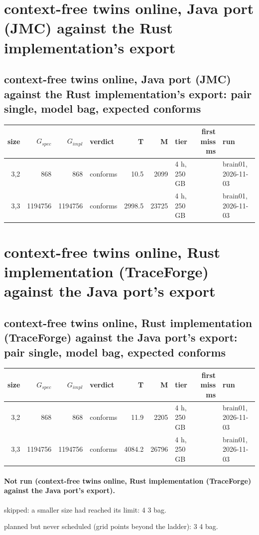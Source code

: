 \documentclass[10pt]{article}
\begin{document}
\section*{context-free twins online, Java port (JMC) against the Rust implementation's export}
\subsection*{context-free twins online, Java port (JMC) against the Rust implementation's export: pair \textsf{single}, model bag, expected conforms}
\begin{longtable}{@{}rrrlrrlrl@{}}
\toprule
size & $G_{\mathit{spec}}$ & $G_{\mathit{impl}}$ & verdict & T & M & tier & first miss ms & run \\
\midrule
\endhead
\color{blue} 3,2 & 868 & 868 & conforms & 10.5 & 2099 & 4 h, 250 GB &  & brain01, 2026-11-03 \\
\color{red} 3,3 & 1194756 & 1194756 & conforms & 2998.5 & 23725 & 4 h, 250 GB &  & brain01, 2026-11-03 \\
\bottomrule
\end{longtable}
\section*{context-free twins online, Rust implementation (TraceForge) against the Java port's export}
\subsection*{context-free twins online, Rust implementation (TraceForge) against the Java port's export: pair \textsf{single}, model bag, expected conforms}
\begin{longtable}{@{}rrrlrrlrl@{}}
\toprule
size & $G_{\mathit{spec}}$ & $G_{\mathit{impl}}$ & verdict & T & M & tier & first miss ms & run \\
\midrule
\endhead
\color{red} 3,2 & 868 & 868 & conforms & 11.9 & 2205 & 4 h, 250 GB &  & brain01, 2026-11-03 \\
\color{red} 3,3 & 1194756 & 1194756 & conforms & 4084.2 & 26796 & 4 h, 250 GB &  & brain01, 2026-11-03 \\
\bottomrule
\end{longtable}
\paragraph{Not run (context-free twins online, Rust implementation (TraceForge) against the Java port's export).}
skipped: a smaller size had reached its limit: 4 3 bag.\par
planned but never scheduled (grid points beyond the ladder): 3 4 bag.\par
\end{document}

